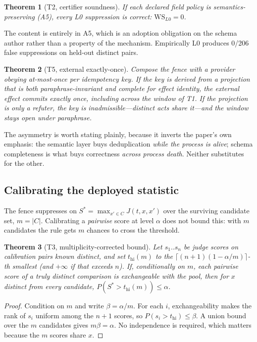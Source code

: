 \documentclass[10pt,twocolumn]{article}
\newtheorem{theorem}{Theorem}
\theoremstyle{definition}
\theoremstyle{remark}
\newcommand{\Sstar}{S^{*}}
\newcommand{\thi}{t_{\mathrm{hi}}}
\begin{document}
\begin{theorem}[T2, certifier soundness]
If each declared field policy is semantics-preserving (A5), every L0 suppression
is correct: $\mathrm{WS}_{L0}=0$.
\end{theorem}

The content is entirely in A5, which is an adoption obligation on the schema
author rather than a property of the mechanism. Empirically L0 produces 0/206
false suppressions on held-out distinct pairs.

\begin{theorem}[T5, external exactly-once]
Compose the fence with a provider obeying at-most-once per idempotency key. If
the key is derived from a projection that is both paraphrase-invariant
\emph{and} complete for effect identity, the external effect commits exactly
once, including across the window of T1. If the projection is only a refuter,
the key is inadmissible---distinct acts share it---and the window stays open
under paraphrase.
\end{theorem}

The asymmetry is worth stating plainly, because it inverts the paper's own
emphasis: the semantic layer buys deduplication \emph{while the process is
alive}; schema completeness is what buys correctness \emph{across process
death}. Neither substitutes for the other.

\subsection{Calibrating the deployed statistic}
\label{sec:conformal}

The fence suppresses on $\Sstar = \max_{x' \in C} J(t,x,x')$ over the surviving
candidate set, $m=|C|$. Calibrating a \emph{pairwise} score at level $\alpha$
does not bound this: with $m$ candidates the rule gets $m$ chances to cross the
threshold.

\begin{theorem}[T3, multiplicity-corrected bound]
Let $s_1..s_n$ be judge scores on calibration pairs known distinct, and set
$\thi(m)$ to the $\lceil (n{+}1)(1-\alpha/m) \rceil$-th smallest (and $+\infty$
if that exceeds $n$). If, conditionally on $m$, each pairwise score of a truly
distinct comparison is exchangeable with the pool, then for $x$ distinct from
every candidate, $P(\Sstar > \thi(m)) \leq \alpha$.
\end{theorem}

\begin{proof}
Condition on $m$ and write $\beta=\alpha/m$. For each $i$, exchangeability makes
the rank of $s_i$ uniform among the $n{+}1$ scores, so $P(s_i > \thi) \le \beta$.
A union bound over the $m$ candidates gives $m\beta=\alpha$. No independence is
required, which matters because the $m$ scores share $x$.
\end{proof}
\end{document}
